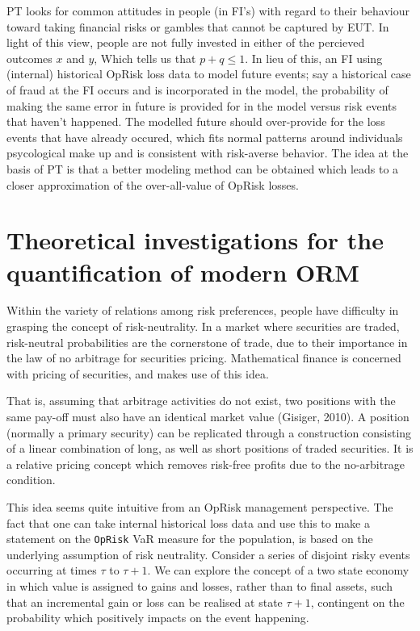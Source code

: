 \documentclass{DissertateUSU}
\begin{document}
PT looks for common attitudes in people (in FI's) with regard to their
behaviour toward taking financial risks or gambles that cannot be
captured by EUT. In light of this view, people are not fully invested in
either of the percieved outcomes \(x\) and \(y\), Which tells us that
\(p+q \leq 1\). In lieu of this, an FI using (internal) historical
OpRisk loss data to model future events; say a historical case of fraud
at the FI occurs and is incorporated in the model, the probability of
making the same error in future is provided for in the model versus risk
events that haven't happened. The modelled future should over-provide
for the loss events that have already occured, which fits normal
patterns around individuals psycological make up and is consistent with
risk-averse behavior. The idea at the basis of PT is that a better
modeling method can be obtained which leads to a closer approximation of
the over-all-value of OpRisk losses.

\section{Theoretical investigations for the quantification of modern ORM}

Within the variety of relations among risk preferences, people have
difficulty in grasping the concept of risk-neutrality. In a market where
securities are traded, risk-neutral probabilities are the cornerstone of
trade, due to their importance in the law of no arbitrage for securities
pricing. Mathematical finance is concerned with pricing of securities,
and makes use of this idea.\medskip

That is, assuming that arbitrage activities do not exist, two positions
with the same pay-off must also have an identical market value (Gisiger,
2010). A position (normally a primary security) can be replicated
through a construction consisting of a linear combination of long, as
well as short positions of traded securities. It is a relative pricing
concept which removes risk-free profits due to the no-arbitrage
condition.\medskip

This idea seems quite intuitive from an OpRisk management perspective.
The fact that one can take internal historical loss data and use this to
make a statement on the \texttt{OpRisk} VaR measure for the population,
is based on the underlying assumption of risk neutrality. Consider a
series of disjoint risky events occurring at times \(\tau\) to
\(\tau + 1\). We can explore the concept of a two state economy in which
value is assigned to gains and losses, rather than to final assets, such
that an incremental gain or loss can be realised at state \(\tau + 1\),
contingent on the probability which positively impacts on the event
happening.\medskip
\end{document}

